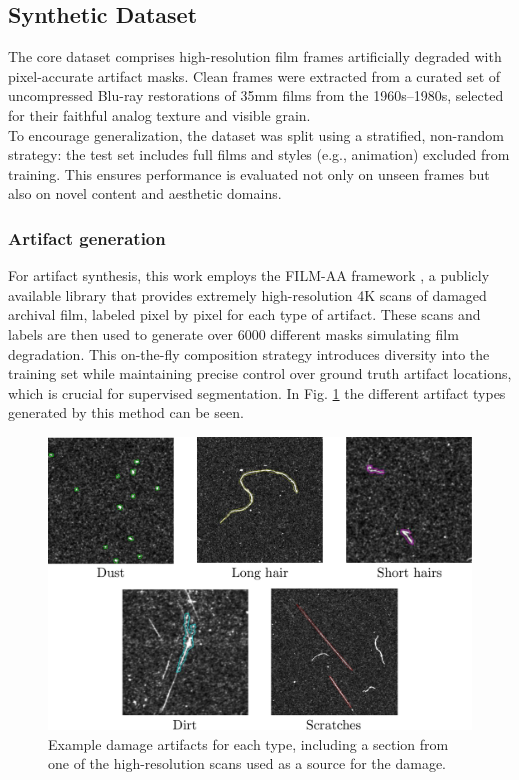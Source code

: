 \documentclass[10pt,a4paper,twocolumn,twoside]{article}
\begin{document}
\subsection{Synthetic Dataset}
The core dataset comprises high-resolution film frames artificially degraded with pixel-accurate artifact masks. Clean frames were extracted from a curated set of uncompressed Blu-ray restorations of 35mm films from the 1960s–1980s, selected for their faithful analog texture and visible grain. \\ To encourage generalization, the dataset was split using a stratified, non-random strategy: the test set includes full films and styles (e.g., animation) excluded from training. This ensures performance is evaluated not only on unseen frames but also on novel content and aesthetic domains.
\subsubsection{Artifact generation}
For artifact synthesis, this work employs the FILM-AA framework \cite{ivanova23analogue}, a publicly available library that provides extremely high-resolution 4K scans of damaged archival film, labeled pixel by pixel for each type of artifact. These scans and labels are then used to generate over 6000 different masks simulating film degradation. This on-the-fly composition strategy introduces diversity into the training set while maintaining precise control over ground truth artifact locations, which is crucial for supervised segmentation. In Fig. \ref{fig:artifacts} the different artifact types generated by this method can be seen. \\
\begin{figure}[h!]
    \centering
    \includegraphics[width=\linewidth]{img/Artifacts.pdf}
    \caption{ \small Example damage artifacts for each type, including a section from one of the high-resolution scans used as a source for the damage.}
    \label{fig:artifacts}
    \vspace{-1em}
\end{figure}
\end{document}
